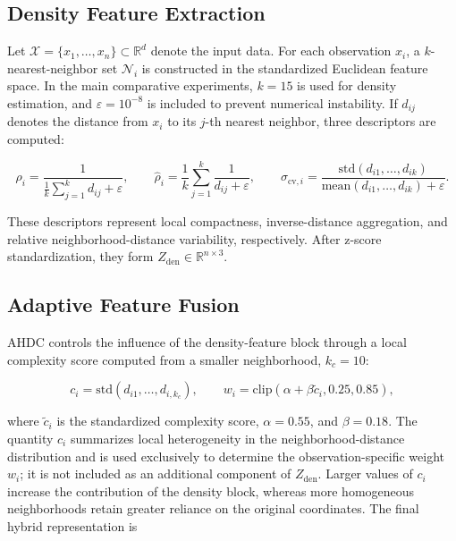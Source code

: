 \documentclass[10pt,twoside]{article}
\numberwithin{equation}{section}
\begin{document}
\subsection{Density Feature Extraction}

Let $\mathcal{X}=\{x_1,\ldots,x_n\}\subset\mathbb{R}^d$ denote the input data. For each observation $x_i$, a $k$-nearest-neighbor set $\mathcal{N}_i$ is constructed in the standardized Euclidean feature space. In the main comparative experiments, $k=15$ is used for density estimation, and $\varepsilon=10^{-8}$ is included to prevent numerical instability. If $d_{ij}$ denotes the distance from $x_i$ to its $j$-th nearest neighbor, three descriptors are computed:

\begin{equation}

	\rho_i=\frac{1}{\frac{1}{k}\sum_{j=1}^{k}d_{ij}+\varepsilon},\qquad

	\hat{\rho}_i=\frac{1}{k}\sum_{j=1}^{k}\frac{1}{d_{ij}+\varepsilon},\qquad

	\sigma_{\mathrm{cv},i}=\frac{\mathrm{std}(d_{i1},\ldots,d_{ik})}{\mathrm{mean}(d_{i1},\ldots,d_{ik})+\varepsilon}.

	\label{eq:density_features}

\end{equation}

These descriptors represent local compactness, inverse-distance aggregation, and relative neighborhood-distance variability, respectively. After z-score standardization, they form $Z_{\mathrm{den}}\in\mathbb{R}^{n\times3}$.



\subsection{Adaptive Feature Fusion}

AHDC controls the influence of the density-feature block through a local complexity score computed from a smaller neighborhood, $k_c=10$:

\begin{equation}

	c_i=\mathrm{std}(d_{i1},\ldots,d_{i,k_c}),\qquad

	w_i=\mathrm{clip}(\alpha+\beta\tilde{c}_i,0.25,0.85),

	\label{eq:weight}

\end{equation}

where $\tilde{c}_i$ is the standardized complexity score, $\alpha=0.55$, and $\beta=0.18$. The quantity $c_i$ summarizes local heterogeneity in the neighborhood-distance distribution and is used exclusively to determine the observation-specific weight $w_i$; it is not included as an additional component of $Z_{\mathrm{den}}$. Larger values of $c_i$ increase the contribution of the density block, whereas more homogeneous neighborhoods retain greater reliance on the original coordinates. The final hybrid representation is
\end{document}
